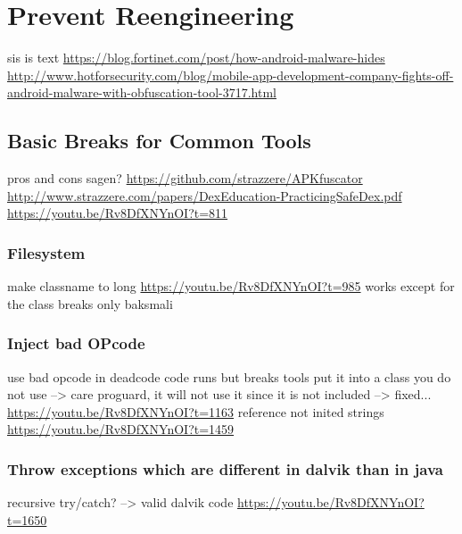 \section{Prevent Reengineering}\label{section:software}
sis is text
\url{https://blog.fortinet.com/post/how-android-malware-hides}\newline
\url{http://www.hotforsecurity.com/blog/mobile-app-development-company-fights-off-android-malware-with-obfuscation-tool-3717.html}\newline


\subsection{Basic Breaks for Common Tools}
pros and cons sagen?\newline
\url{https://github.com/strazzere/APKfuscator}\newline
\url{http://www.strazzere.com/papers/DexEducation-PracticingSafeDex.pdf}\newline
\url{https://youtu.be/Rv8DfXNYnOI?t=811}
\subsubsection{Filesystem}
make classname to long\newline
\url{https://youtu.be/Rv8DfXNYnOI?t=985} works except for the class\newline
breaks only baksmali
\subsubsection{Inject bad OPcode}
use bad opcode in deadcode \newline
code runs but breaks tools\newline
put it into a class you do not use --> care proguard, it will not use it since it is not included\newline
--> fixed...\newline
\url{https://youtu.be/Rv8DfXNYnOI?t=1163}\newline
reference not inited strings\newline
\url{https://youtu.be/Rv8DfXNYnOI?t=1459}
\subsubsection{Throw exceptions which are different in dalvik than in java}
recursive try/catch? --> valid dalvik code\newline
\url{https://youtu.be/Rv8DfXNYnOI?t=1650}
